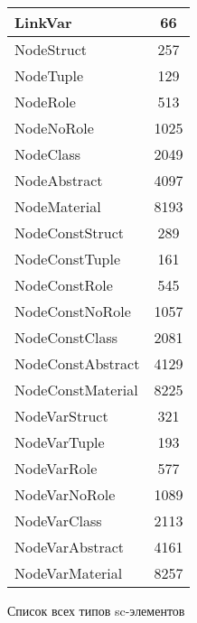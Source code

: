 \begin{figure}[H]
\begin{tabular}{  | p{50mm} | c | }
		\hline
		LinkVar & 66 \\
		\hline
		NodeStruct & 257 \\
		\hline
		NodeTuple & 129 \\
		\hline
		NodeRole & 513 \\
		\hline
		NodeNoRole & 1025 \\
		\hline
		NodeClass & 2049 \\
		\hline
		NodeAbstract & 4097 \\
		\hline
		NodeMaterial & 8193 \\
		\hline
		NodeConstStruct & 289 \\
		\hline
		NodeConstTuple & 161 \\
		\hline
		NodeConstRole & 545 \\
		\hline
		NodeConstNoRole & 1057 \\
		\hline
		NodeConstClass & 2081 \\
		\hline
		NodeConstAbstract & 4129 \\
		\hline
		NodeConstMaterial & 8225 \\
		\hline
		NodeVarStruct & 321 \\
		\hline
		NodeVarTuple & 193 \\
		\hline
		NodeVarRole & 577 \\
		\hline
		NodeVarNoRole & 1089 \\
		\hline
		NodeVarClass & 2113 \\
		\hline
		NodeVarAbstract & 4161 \\
		\hline
		NodeVarMaterial & 8257 \\
		\hline
\end{tabular}
    \caption{Список всех типов sc-элементов}
    \label{all_types}

\end{figure}
